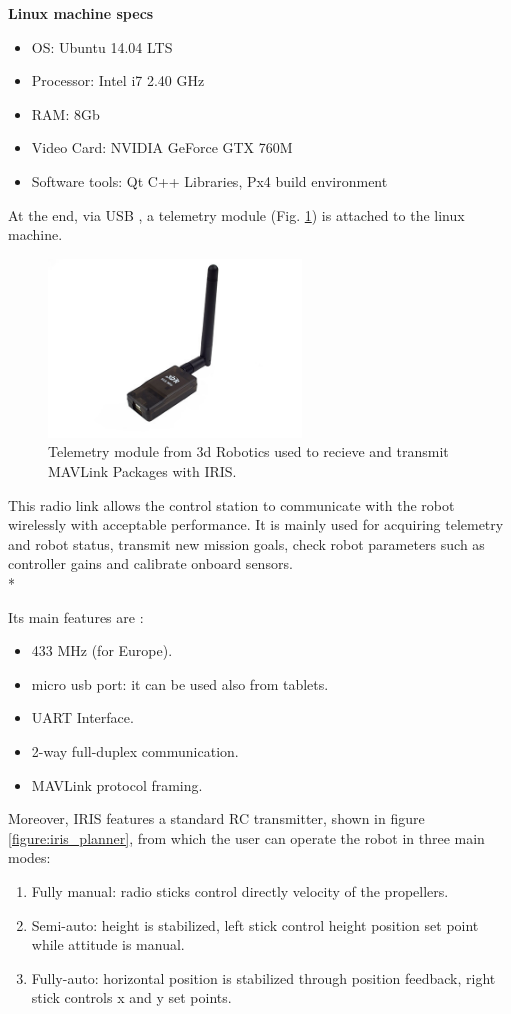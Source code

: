 \noindent
\textbf{Linux machine specs} 
\begin{itemize}

\item OS: Ubuntu 14.04 LTS 
\item Processor: Intel i7 2.40 GHz
\item RAM: 8Gb
\item Video Card: NVIDIA GeForce GTX 760M
\item Software tools: Qt C++ Libraries, Px4 build environment \cite{PX4Build}
\end{itemize}
At the end, via USB , a telemetry module (Fig. \ref{figure:telemetry}) is attached to the linux machine.
\begin{figure}[h]
\centering
 \includegraphics[width=0.6\textwidth]{telemetry.jpg}
 \caption[Telemetry module]{Telemetry module from 3d Robotics used to recieve and transmit MAVLink Packages with IRIS.}
 \label{figure:telemetry}
\end{figure}
This radio link allows the control station to communicate with the robot wirelessly with acceptable performance. It is mainly used for acquiring telemetry and robot status, transmit new mission goals, check robot parameters such as controller gains and calibrate onboard sensors. \\*

\noindent
Its main features are \cite{3Dr}:

\begin{itemize}
\item 433 MHz (for Europe).
\item micro usb port: it can be used also from tablets.
\item UART Interface.
\item 2-way full-duplex communication.
\item MAVLink protocol framing.
\end{itemize}
Moreover, IRIS features a standard RC transmitter, shown in figure \ref{figure:iris_planner}, from which the user can operate the robot in three main modes:
\begin{enumerate}
\item Fully manual: radio sticks control directly velocity of the propellers.
\item Semi-auto: height is stabilized, left stick control height position set point while attitude is manual.
\item Fully-auto: horizontal position is stabilized through position feedback, right stick controls x and y set points.
\end{enumerate}

